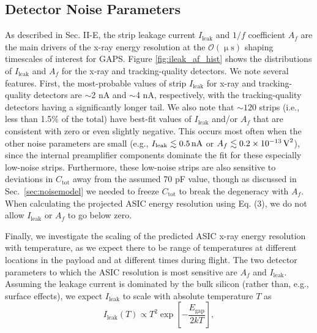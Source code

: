 \documentclass[journal]{IEEEtran}
\begin{document}
\subsection{Detector Noise Parameters}
As described in Sec. II-E, the strip leakage current $I_\text{leak}$ and $1/f$ coefficient $A_f$ are the main drivers of the x-ray energy resolution at the $\mathcal{O}(\upmu\text{s})$ shaping timescales of interest for GAPS. Figure \ref{fig:ileak_af_hist} shows the distributions of $I_\text{leak}$ and $A_f$ for the x-ray and tracking-quality detectors. We note several features. First, the most-probable values of strip $I_\text{leak}$ for x-ray and tracking-quality detectors are ${\sim}$2 nA and ${\sim}$4 nA, respectively, with the tracking-quality detectors having a significantly longer tail. We also note that ${\sim}120$ strips (i.e., less than 1.5\% of the total) have best-fit values of $I_\text{leak}$ and/or $A_f$ that are consistent with zero or even slightly negative. This occurs most often when the other noise parameters are small (e.g., $I_\text{leak} \lesssim 0.5\text{\,nA}$ or ${A_f \lesssim 0.2\times 10^{-13}\text{\,V}^2}$), since the internal preamplifier components dominate the fit for these especially low-noise strips. Furthermore, these low-noise strips are also sensitive to deviations in $C_\text{tot}$ away from the assumed 70 pF value, though as discussed in Sec.~\ref{sec:noisemodel} we needed to freeze $C_\text{tot}$ to break the degeneracy with $A_f$. When calculating the projected ASIC energy resolution using Eq. (3), we do not allow $I_\text{leak}$ or $A_f$ to go below zero. 
%
\par Finally, we investigate the scaling of the predicted ASIC x-ray energy resolution with temperature, as we expect there to be range of temperatures at different locations in the payload and at different times during flight. The two detector parameters to which the ASIC resolution is most sensitive are $A_f$ and $I_\text{leak}$. Assuming the leakage current is dominated by the bulk silicon (rather than, e.g., surface effects), we expect $I_\text{leak}$ to scale with absolute temperature $T$ as \cite{Chilingarov_2013}
\begin{equation}
    I_\text{leak}(T) \propto T^2 \exp\left[-\frac{E_\text{gap}}{2kT}\right],
\end{equation}
\end{document}
